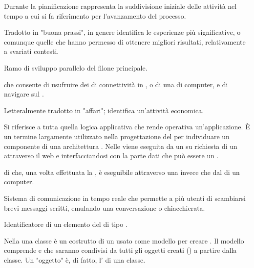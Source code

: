 {Durante la pianificazione rappresenta la suddivisione iniziale delle attività nel tempo a cui si fa riferimento per l'avanzamento del processo.}

{Tradotto in "buona prassi", in genere identifica le esperienze più significative, o comunque quelle che hanno permesso di ottenere migliori risultati, relativamente a svariati contesti.}

{Ramo di sviluppo parallelo del filone principale.}

{ che consente di usufruire dei  di connettività in , o di una  di computer, e di navigare sul .}


{Letteralmente tradotto in "affari"; identifica un'attività economica.}


{Si riferisce a tutta quella logica applicativa che rende operativa un'applicazione. \`{E} un termine largamente utilizzato nella progettazione del  per individuare un componente  di una architettura . Nelle     viene eseguita da un  su richiesta di un  attraverso il    web e interfacciandosi con la parte dati che può essere un .}



{ di  che, una volta effettuata la , è eseguibile attraverso una  invece che dal  di un computer.}


{Sistema di comunicazione in tempo reale che permette a più utenti di scambiarsi brevi messaggi scritti, emulando una conversazione o chiacchierata.}

{Identificatore di un elemento del  di tipo .}

{Nella   una classe è un costrutto di un  usato come modello per creare . Il modello comprende  e  che saranno condivisi da tutti gli oggetti creati () a partire dalla classe. Un "oggetto" è, di fatto, l' di una classe.}

